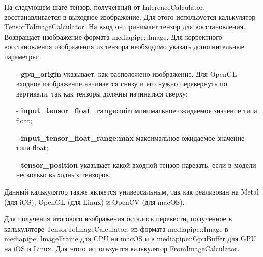 \documentclass[a4paper,14pt]{extreport}
\begin{document}
        На следующем шаге тензор, полученный от InferenceCalculator, восстанавливается в выходное изображение. Для этого используется калькулятор \hypertarget{TensorToImage}{TensorToImageCalculator}. На вход он принимает тензор для восстановления. Возвращает изображение формата mediapipe::Image. Для корректного восстановления изображения из тензора необходимо указать дополнительные параметры:
        \begin{itemize}
          \item[-] \textbf{gpu\_origin} указывает, как расположено изображение. Для OpenGL входное изображение начинается снизу и его нужно перевернуть по вертикали, так как тензоры должны начинаться сверху;
          \item[-] \textbf{input\_tensor\_float\_range:min} минимальное ожидаемое значение типа float;
          \item[-] \textbf{input\_tensor\_float\_range:max} максимальное ожидаемое значение типа float;
          \item[-] \textbf{tensor\_position} указывает какой входной тензор нарезать, если в модели несколько выходных тензоров.
        \end{itemize}
        Данный калькулятор также является универсальным, так как реализован на Metal (для iOS), OpenGL (для Linux) и OpenCV (для macOS).
        

        Для получения итогового изображения осталось перевести, полученное в калькуляторе TensorToImageCalculator, из формата mediapipe::Image в mediapipe::ImageFrame для CPU на macOS и в mediapipe::GpuBuffer для GPU на iOS и Linux. Для этого используется калькулятор FromImageCalculator.
        
        
\end{document}
